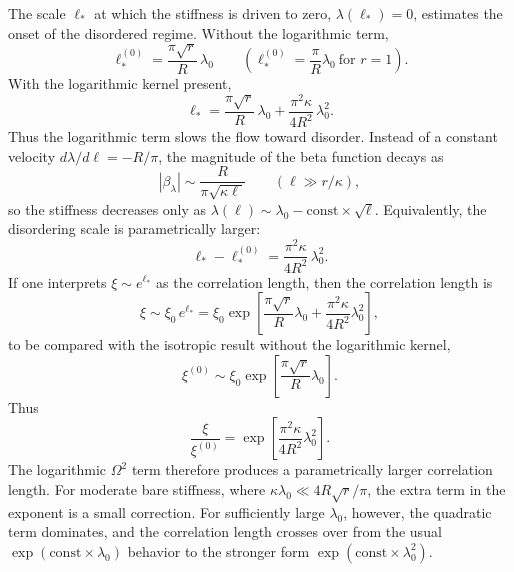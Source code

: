 \documentclass[aps,prx,preprint,amsmath,amssymb]{revtex4-2}
\begin{document}
The scale \(\ell_*\) at which the stiffness is driven to zero,
\(\lambda(\ell_*)=0\), estimates the onset of the disordered regime.  Without
the logarithmic term,
\begin{equation}\label{eq:ellstar-nolog}
\ell_*^{(0)}=\frac{\pi\sqrt{r}}{R}\,\lambda_0
\qquad
\left(\ell_*^{(0)}=\frac{\pi}{R}\lambda_0\ \text{for } r=1\right).
\end{equation}
With the logarithmic kernel present,
\begin{equation}\label{eq:ellstar-log}
\ell_*=
\frac{\pi\sqrt{r}}{R}\,\lambda_0
+\frac{\pi^2\kappa}{4R^2}\,\lambda_0^2.
\end{equation}
Thus the logarithmic term slows the flow toward disorder.  Instead of a constant
velocity \(d\lambda/d\ell=-R/\pi\), the magnitude of the beta function decays as
\begin{equation}
\left|\beta_\lambda\right|
\sim
\frac{R}{\pi\sqrt{\kappa\ell}}
\qquad
(\ell\gg r/\kappa),
\end{equation}
so the stiffness decreases only as \(\lambda(\ell)\sim \lambda_0-\text{const}
\times\sqrt{\ell}\).  Equivalently, the disordering scale is parametrically
larger:
\begin{equation}
\ell_*-\ell_*^{(0)}
=
\frac{\pi^2\kappa}{4R^2}\,\lambda_0^2.
\end{equation}
If one interprets \(\xi\sim e^{\ell_*}\) as the correlation length, then the
correlation length is
\begin{equation}\label{eq:xi-log}
\xi
\sim
\xi_0\,e^{\ell_*}
=
\xi_0
\exp\!\left[
\frac{\pi\sqrt{r}}{R}\lambda_0
+\frac{\pi^2\kappa}{4R^2}\lambda_0^2
\right],
\end{equation}
to be compared with the isotropic result without the logarithmic kernel,
\begin{equation}\label{eq:xi-nolog}
\xi^{(0)}
\sim
\xi_0
\exp\!\left[
\frac{\pi\sqrt{r}}{R}\lambda_0
\right].
\end{equation}
Thus
\begin{equation}\label{eq:xi-ratio}
\frac{\xi}{\xi^{(0)}}
=
\exp\!\left[
\frac{\pi^2\kappa}{4R^2}\lambda_0^2
\right].
\end{equation}
The logarithmic \(\Omega^2\) term therefore produces a parametrically larger
correlation length.  For moderate bare stiffness, where
\(\kappa\lambda_0\ll 4R\sqrt{r}/\pi\), the extra term in the exponent is a small
correction.  For sufficiently large \(\lambda_0\), however, the quadratic term
dominates, and the correlation length crosses over from the usual
\(\exp(\text{const}\times \lambda_0)\) behavior to the stronger form
\(\exp(\text{const}\times \lambda_0^2)\).
\end{document}
